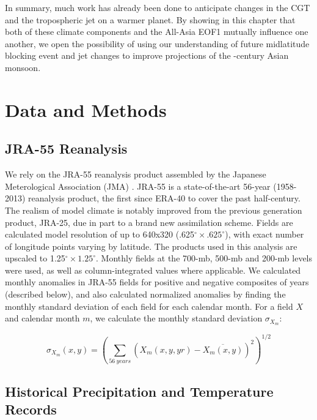 	In summary, much work has already been done to anticipate changes in the CGT and the tropospheric jet on a warmer planet. By showing in this chapter that both of these climate components and the All-Asia EOF1 mutually influence one another, we open the possibility of using our understanding of future midlatitude blocking event and jet changes to improve projections of the -century Asian monsoon.

\section{Data and Methods}

\subsection{JRA-55 Reanalysis}

	We rely on the JRA-55 reanalysis product assembled by the Japanese Meterological Association (JMA) \citep{Kobayashi2015,Harada2016}. JRA-55 is a state-of-the-art 56-year (1958-2013) reanalysis product, the first since ERA-40 to cover the past half-century. The realism of model climate is notably improved from the previous generation product, JRA-25, due in part to a brand new assimilation scheme. Fields are calculated model resolution of up to 640x320 (.625$^{\circ} \times .625^{\circ}$), with exact number of longitude points varying by latitude. The products used in this analysis are upscaled to 1.25$^{\circ} \times 1.25^{\circ}$. Monthly fields at the 700-mb, 500-mb and 200-mb levels were used, as well as column-integrated values where applicable. We calculated monthly anomalies in JRA-55 fields for positive and negative composites of years (described below), and also calculated normalized anomalies by finding the monthly standard deviation of each field for each calendar month. For a field $X$ and calendar month $m$, we calculate the monthly standard deviation $\sigma_{X_m}$:
	
\begin{equation*}
	\sigma_{X_m}(x,y)=\left(\sum_{56\ years} \left(X_m(x,y,yr)-\overline{X_m(x,y)}\right)^2 \right)^{1/2}
\end{equation*}
	
\subsection{Historical Precipitation and Temperature Records}

